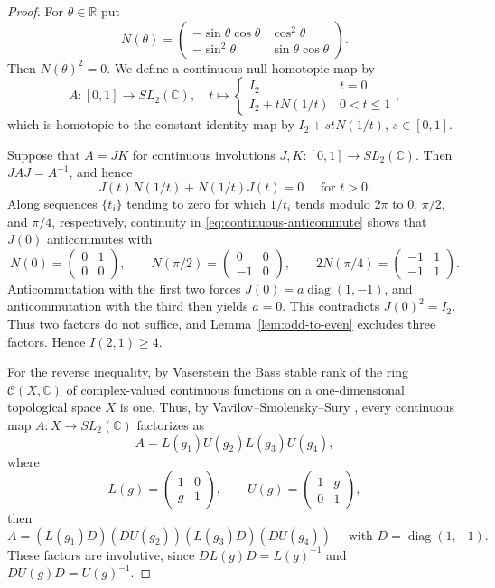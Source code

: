 \documentclass{amsart}
\newcommand{\C}{\mathbb{C}}
\newcommand{\diag}{\operatorname{diag}}
\theoremstyle{definition}
\begin{document}
\begin{proof}
For $\theta\in\mathbb R$ put
\[
 N(\theta)=
 \begin{pmatrix}
  -\sin\theta\cos\theta&\cos^2\theta\\
  -\sin^2\theta&\sin\theta\cos\theta
 \end{pmatrix}.
\]
Then $N(\theta)^2=0$.  We define a continuous null-homotopic map
by
\[
 A:[0,1]\to SL_2(\C), \quad t \mapsto \begin{cases}
     I_2 & t = 0 \\
     I_2+tN(1/t) & 0 < t \le 1
 \end{cases},
\]
which is homotopic to the constant identity map by $I_2+stN(1/t)$, $s\in [0,1]$. %

Suppose that $A=JK$ for continuous involutions $J,K : [0,1] \to SL_2(\C)$.  Then
$JAJ=A^{-1}$, and hence
\begin{equation}\label{eq:continuous-anticommute}
 J(t)N(1/t)+N(1/t)J(t)=0\quad \text{ for } t>0.
\end{equation}
Along sequences $\{ t_i \}$ tending to zero for which $1/t_i$ tends modulo $2\pi$ to
$0$, $\pi/2$, and $\pi/4$, respectively, continuity in
\eqref{eq:continuous-anticommute} shows that $J(0)$ anticommutes with
\[
 N(0)=\begin{pmatrix}0&1\\0&0\end{pmatrix},\qquad
 N(\pi/2)=\begin{pmatrix}0&0\\-1&0\end{pmatrix},\qquad
 2N(\pi/4)=\begin{pmatrix}-1&1\\-1&1\end{pmatrix}.
\]
Anticommutation with the
first two forces $J(0)=a\diag(1,-1)$, and anticommutation with the third then
yields $a=0$.  This contradicts $J(0)^2=I_2$.  Thus two factors do not suffice,
and Lemma~\ref{lem:odd-to-even} excludes three factors. Hence $I(2,1) \ge 4$.

For the reverse inequality, by Vaserstein \cite[Theorem 7]{Vaserstein1971} the Bass stable rank of the ring $\mathcal{C}(X,\C)$ of complex-valued continuous functions on a one-dimensional topological space $X$ is one. Thus, by Vavilov--Smolensky--Sury \cite[Lemma 1]{Vavilov}, every continuous map $A : X \to SL_2(\C)$ factorizes as 
\[
 A=L(g_1)U(g_2)L(g_3)U(g_4),
\]
where
\[
 L(g)=\begin{pmatrix}1&0\\g&1\end{pmatrix},\qquad
 U(g)=\begin{pmatrix}1&g\\0&1\end{pmatrix},
\]
then
\begin{equation}\label{eq:lulu-involutions-cont}
 A=(L(g_1)D)(DU(g_2))(L(g_3)D)(DU(g_4)) \quad \text{ with } D=\diag (1, -1).
\end{equation}
These factors are involutive, since $DL(g)D=L(g)^{-1}$ and $DU(g)D=U(g)^{-1}$.
\end{proof}
\end{document}
